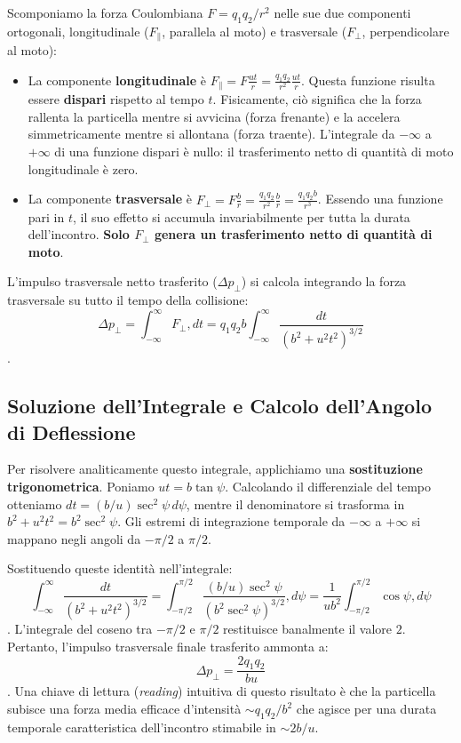 Scomponiamo la forza Coulombiana $F = q_1 q_2 / r^2$ nelle sue due componenti ortogonali, longitudinale ($F_{\parallel}$, parallela al moto) e trasversale ($F_{\perp}$, perpendicolare al moto):
\begin{itemize}
\item La componente \textbf{longitudinale} è $F_{\parallel} = F \frac{ut}{r} = \frac{q_1 q_2}{r^2} \frac{ut}{r}$. Questa funzione risulta essere \textbf{dispari} rispetto al tempo $t$. Fisicamente, ciò significa che la forza rallenta la particella mentre si avvicina (forza frenante) e la accelera simmetricamente mentre si allontana (forza traente). L'integrale da $-\infty$ a $+\infty$ di una funzione dispari è nullo: il trasferimento netto di quantità di moto longitudinale è zero.
\item La componente \textbf{trasversale} è $F_{\perp} = F \frac{b}{r} = \frac{q_1 q_2}{r^2} \frac{b}{r} = \frac{q_1 q_2 b}{r^3}$. Essendo una funzione pari in $t$, il suo effetto si accumula invariabilmente per tutta la durata dell'incontro. \textbf{Solo $F_{\perp}$ genera un trasferimento netto di quantità di moto}.
\end{itemize}

L'impulso trasversale netto trasferito ($\Delta p_{\perp}$) si calcola integrando la forza trasversale su tutto il tempo della collisione:
\begin{equation}
\Delta p_{\perp} = \int_{-\infty}^{\infty} F_{\perp} , dt = q_1 q_2 b \int_{-\infty}^{\infty} \frac{dt}{(b^2 + u^2 t^2)^{3/2}}
\end{equation}
.

\subsection{Soluzione dell'Integrale e Calcolo dell'Angolo di Deflessione}
Per risolvere analiticamente questo integrale, applichiamo una \textbf{sostituzione trigonometrica}. Poniamo $ut = b \tan\psi$. Calcolando il differenziale del tempo otteniamo $dt = (b/u) \sec^2\psi \, d\psi$, mentre il denominatore si trasforma in $b^2 + u^2 t^2 = b^2 \sec^2\psi$. Gli estremi di integrazione temporale da $-\infty$ a $+\infty$ si mappano negli angoli da $-\pi/2$ a $\pi/2$.

Sostituendo queste identità nell'integrale:
\begin{equation}
\int_{-\infty}^{\infty} \frac{dt}{(b^2 + u^2 t^2)^{3/2}} = \int_{-\pi/2}^{\pi/2} \frac{(b/u) \sec^2\psi}{(b^2 \sec^2\psi)^{3/2}} , d\psi = \frac{1}{ub^2} \int_{-\pi/2}^{\pi/2} \cos\psi , d\psi
\end{equation}
. L'integrale del coseno tra $-\pi/2$ e $\pi/2$ restituisce banalmente il valore $2$. Pertanto, l'impulso trasversale finale trasferito ammonta a:
\begin{equation}
\Delta p_{\perp} = \frac{2 q_1 q_2}{bu}
\end{equation}
.
Una chiave di lettura (\textit{reading}) intuitiva di questo risultato è che la particella subisce una forza media efficace d'intensità $\sim q_1 q_2 / b^2$ che agisce per una durata temporale caratteristica dell'incontro stimabile in $\sim 2b/u$.

